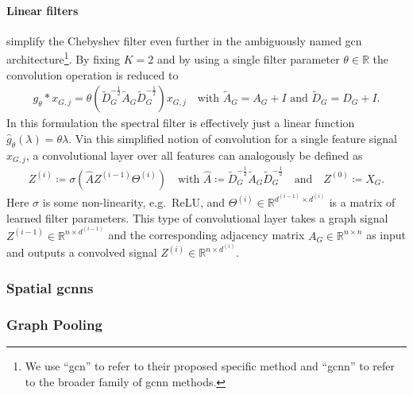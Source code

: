 \paragraph{Linear filters}
\citet{Kipf2017} simplify the Chebyshev filter even further in the ambiguously named \ac{gcn} architecture\footnote{
	We use ``\acs{gcn}'' to refer to their proposed specific method and ``\acs{gcnn}'' to refer to the broader family of \acl{gcnn} methods.
}.
By fixing $K = 2$ and by using a single filter parameter $\theta \in \mathbb{R}$ the convolution operation is reduced to
\begin{align}
	g_{\theta} * x_{G,j} = \theta \left( \tilde{D}_G^{-\frac{1}{2}} \tilde{A}_G \tilde{D}_G^{-\frac{1}{2}} \right) x_{G,j}
	\quad\text{with $\tilde{A}_G = A_G + I$ and $\tilde{D}_G = D_G + I$.}
\end{align}
In this formulation the spectral filter is effectively just a linear function $\hat{g}_{\theta}(\lambda) = \theta \lambda$.
Via this simplified notion of convolution for a single feature signal $x_{G,j}$, a convolutional layer over all features can analogously be defined as
\begin{align}
	Z^{(i)} \coloneqq \sigma\left( \hat{A} Z^{(i-1)} \Theta^{(i)} \right)
	\quad\text{with } \hat{A} \coloneqq \tilde{D}_G^{-\frac{1}{2}} \tilde{A}_G \tilde{D}_G^{-\frac{1}{2}}\quad\text{and}\quad Z^{(0)} \coloneqq X_G \text{.}
\end{align}
Here $\sigma$ is some non-linearity, e.g.\ ReLU, and $\Theta^{(i)} \in \mathbb{R}^{d^{(i-1)} \times d^{(i)}}$ is a matrix of learned filter parameters.
This type of convolutional layer takes a graph signal $Z^{(i-1)} \in \mathbb{R}^{n \times d^{(i-1)}}$ and the corresponding adjacency matrix $A_G \in \mathbb{R}^{n \times n}$ as input and outputs a convolved signal $Z^{(i)} \in \mathbb{R}^{n \times d^{(i)}}$.

\subsubsection{Spatial \acp{gcnn}}

\subsubsection{Graph Pooling}
